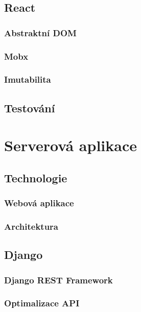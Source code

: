 \documentclass[a4paper,11pt,titlepage,fleqn]{article}
\begin{document}
    \subsection{React}
        
        \subsubsection{Abstraktní DOM}
        \subsubsection{Mobx}
        \subsubsection{Imutabilita}

    \subsection{Testování}


\newpage
\section{Serverová aplikace}
    
    \subsection{Technologie}
        \subsubsection{Webová aplikace}

        \subsubsection{Architektura}

    \subsection{Django}
        \subsubsection{Django REST Framework}
        \subsubsection{Optimalizace API}
\end{document}
